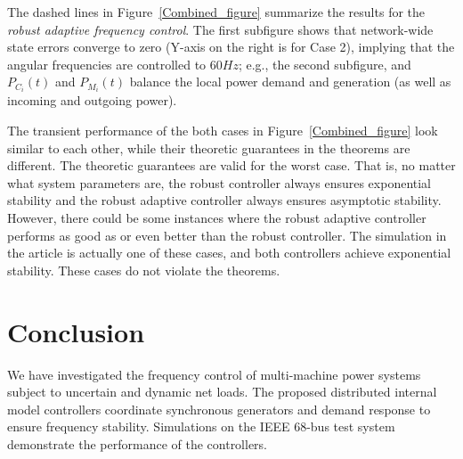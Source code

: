 \documentclass[journal]{IEEEtran}
\begin{document}
The dashed lines in Figure~\ref{Combined_figure} summarize the results for the \emph{robust adaptive frequency control}.
The first subfigure shows that network-wide state errors converge to zero (Y-axis on the right is for Case 2), implying that the angular frequencies are controlled to $60\textit{Hz}$; e.g., the second subfigure, and $P_{C_i}(t)$ and $P_{M_{i}}(t)$ balance the local power demand and generation (as well as incoming and outgoing power).


The transient performance of the both cases in Figure~\ref{Combined_figure} look similar to each other, while their theoretic guarantees in the theorems are different.
The theoretic guarantees are valid for the worst case. That is, no matter what system parameters are, the robust controller always ensures exponential stability and the robust adaptive controller always ensures asymptotic stability. However, there could be some instances where the robust adaptive controller performs as good as or even better than the robust controller. The simulation in the article is actually one of these cases, and both controllers achieve exponential stability. These cases do not violate the theorems.


\section{Conclusion}
We have investigated the frequency control of multi-machine power systems subject to uncertain and dynamic net loads.
The proposed distributed internal model controllers coordinate synchronous generators and demand response to ensure frequency stability.
Simulations on the IEEE 68-bus test system demonstrate the performance of the controllers.
\end{document}
